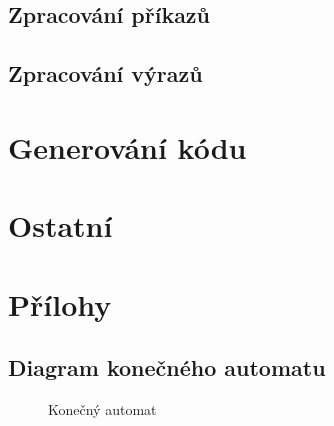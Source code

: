 \documentclass[a4paper]{article}
\begin{document}
\subsection{Zpracování příkazů}
\subsection{Zpracování výrazů}

\section{Generování kódu}
\section{Ostatní}

\section{Přílohy}

\subsection{Diagram konečného automatu}
\begin{landscape}
    \begin{figure}[p]
        \begin{center}
        \end{center}
        \caption{Konečný automat}
    \end{figure}
\end{landscape}
\end{document}
